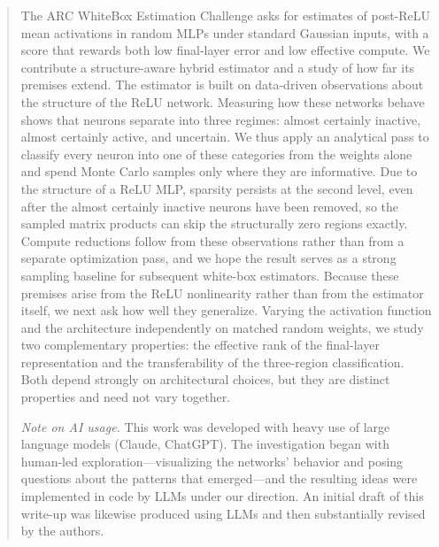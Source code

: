 \begin{abstract}
The ARC WhiteBox Estimation Challenge asks for estimates of post-ReLU mean activations in random MLPs under standard Gaussian inputs, with a score that rewards both low final-layer error and low effective compute. We contribute a structure-aware hybrid estimator and a study of how far its premises extend. The estimator is built on data-driven observations about the structure of the ReLU network. Measuring how these networks behave shows that neurons separate into three regimes: almost certainly inactive, almost certainly active, and uncertain. We thus apply an analytical pass to classify every neuron into one of these categories from the weights alone and spend Monte Carlo samples only where they are informative. Due to the structure of a ReLU MLP, sparsity persists at the second level, even after the almost certainly inactive neurons have been removed, so the sampled matrix products can skip the structurally zero regions exactly. Compute reductions follow from these observations rather than from a separate optimization pass, and we hope the result serves as a strong sampling baseline for subsequent white-box estimators. Because these premises arise from the ReLU nonlinearity rather than from the estimator itself, we next ask how well they generalize. Varying the activation function and the architecture independently on matched random weights, we study two complementary properties: the effective rank of the final-layer representation and the transferability of the three-region classification. Both depend strongly on architectural choices, but they are distinct properties and need not vary together.

\smallskip
\noindent\textit{Note on AI usage.} This work was developed with heavy use of large language models (Claude, ChatGPT). The investigation began with human-led exploration---visualizing the networks' behavior and posing questions about the patterns that emerged---and the resulting ideas were implemented in code by LLMs under our direction. An initial draft of this write-up was likewise produced using LLMs and then substantially revised by the authors.
\end{abstract}